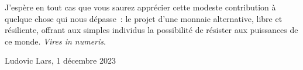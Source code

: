 J'espère en tout cas que vous saurez apprécier cette modeste contribution à quelque chose qui nous dépasse~: le projet d'une monnaie alternative, libre et résiliente, offrant aux simples individus la possibilité de résister aux puissances de ce monde. \emph{Vires in numeris}.

\begin{flushright}Ludovic Lars, 1\ier{} décembre 2023\end{flushright}

%
%
%
%
